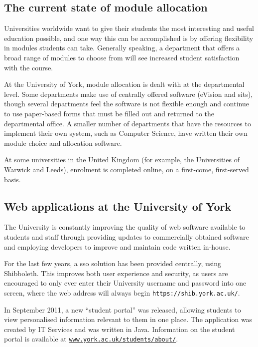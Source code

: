 \documentclass[draft]{scrartcl}
\begin{document}
\subsection{The current state of module allocation}


Universities worldwide want to give their students the most interesting and
useful education possible, and one way this can be accomplished is by offering
flexibility in modules students can take. Generally speaking, a department
that offers a broad range of modules to choose from will see increased student
satisfaction with the course.

At the University of York, module allocation is dealt with at the departmental
level. Some departments make use of centrally offered software (eVision and
\gls{sits}), though several departments feel the software is not flexible
enough and continue to use paper-based forms that must be filled out and
returned to the departmental office. A smaller number of departments that have
the resources to implement their own system, such as Computer Science, have
written their own module choice and allocation software.

At some universities in the United Kingdom (for example, the Universities of
Warwick and Leeds), enrolment is completed online, on a first-come,
first-served basis.


\subsection{Web applications at the University of York}


The University is constantly improving the quality of web software available
to students and staff through providing updates to commercially obtained
software and employing developers to improve and maintain code written
in-house.

For the last few years, a \gls{sso} solution has been provided
centrally, using Shibboleth. This improves both user experience and security,
as users are encouraged to only ever enter their University username and
password into one screen, where the web address will always begin
\texttt{https://shib.york.ac.uk/}.

In September 2011, a new ``student portal'' was released, allowing students to
view personalised information relevant to them in one place. The application
was created by IT Services and was written in Java. Information on the student
portal is available at
\texttt{\href{https://www.york.ac.uk/students/about/}{www.york.ac.uk/students/about/}}.
\end{document}
